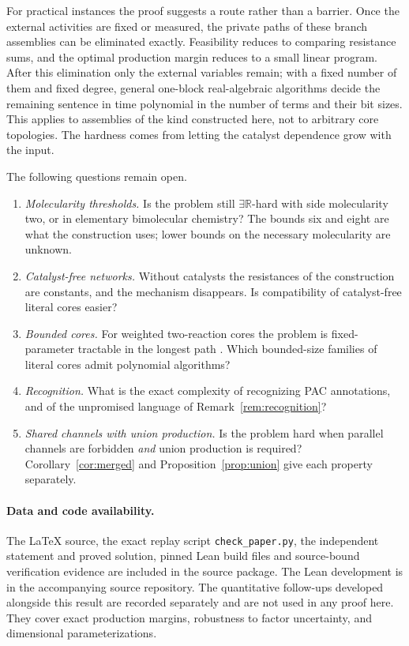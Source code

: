 \documentclass[11pt,a4paper]{article}
\makeatletter
\newcommand{\PaperRepository}{}
\theoremstyle{plain}
\theoremstyle{definition}
\theoremstyle{remark}
\newcommand{\ER}{\exists\mathbb{R}}
\newcommand{\RepoPhrase}{\ifx\PaperRepository\@empty the accompanying source repository\else\url{\PaperRepository}\fi}
\makeatother
\begin{document}
For practical instances the proof suggests a route rather than a barrier. Once the external activities are fixed or measured, the private paths of these branch assemblies can be eliminated exactly. Feasibility reduces to comparing resistance sums, and the optimal production margin reduces to a small linear program. After this elimination only the external variables remain; with a fixed number of them and fixed degree, general one-block real-algebraic algorithms \citep{basu2014} decide the remaining sentence in time polynomial in the number of terms and their bit sizes. This applies to assemblies of the kind constructed here, not to arbitrary core topologies. The hardness comes from letting the catalyst dependence grow with the input.

The following questions remain open.
\begin{enumerate}[label=(\arabic*)]
\item \emph{Molecularity thresholds.} Is the problem still $\ER$-hard with side molecularity two, or in elementary bimolecular chemistry? The bounds six and eight are what the construction uses; lower bounds on the necessary molecularity are unknown.
\item \emph{Catalyst-free networks.} Without catalysts the resistances of the construction are constants, and the mechanism disappears. Is compatibility of catalyst-free literal cores easier?
\item \emph{Bounded cores.} For weighted two-reaction cores the problem is fixed-parameter tractable in the longest path \citep{fpt2026}. Which bounded-size families of literal cores admit polynomial algorithms?
\item \emph{Recognition.} What is the exact complexity of recognizing PAC annotations, and of the unpromised language of Remark~\ref{rem:recognition}?
\item \emph{Shared channels with union production.} Is the problem hard when parallel channels are forbidden \emph{and} union production is required? Corollary~\ref{cor:merged} and Proposition~\ref{prop:union} give each property separately.
\end{enumerate}

\paragraph{Data and code availability.}
The \LaTeX{} source, the exact replay script \texttt{check\_paper.py}, the independent statement and proved solution, pinned Lean build files and source-bound verification evidence are included in the source package. The Lean development is in \RepoPhrase. The quantitative follow-ups developed alongside this result are recorded separately and are not used in any proof here. They cover exact production margins, robustness to factor uncertainty, and dimensional parameterizations.



\end{document}
